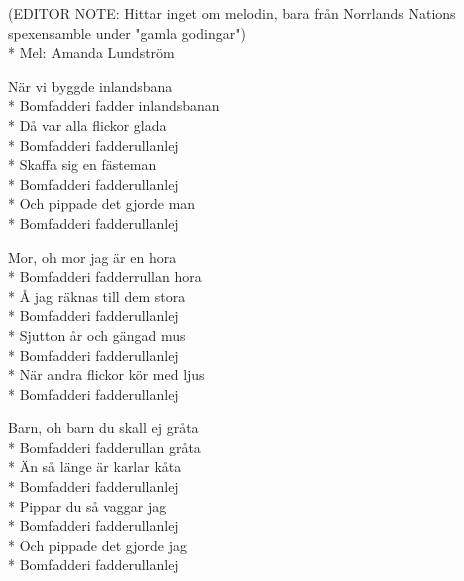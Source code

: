 \begin{SongText}[Inlandsbanan]
    \begin{SongInfo}
        (EDITOR NOTE: Hittar inget om melodin, bara från Norrlands Nations spexensamble under "gamla godingar")\\*%
        Mel: Amanda Lundström
    \end{SongInfo}
    \begin{SongVerse}
        När vi byggde inlandsbana\\*%
        Bomfadderi fadder inlandsbanan\\*%
        Då var alla flickor glada\\*%
        Bomfadderi fadderullanlej\\*%
        Skaffa sig en fästeman\\*%
        Bomfadderi fadderullanlej\\*%
        Och pippade det gjorde man \\*%
        Bomfadderi fadderullanlej
    \end{SongVerse}
    \begin{SongVerse}
        Mor, oh mor jag är en hora\\*%
        Bomfadderi fadderrullan hora\\*%
        Å jag räknas till dem stora\\*%
        Bomfadderi fadderullanlej\\*%
        Sjutton år och gängad mus\\*%
        Bomfadderi fadderullanlej\\*%
        När andra flickor kör med ljus\\*%
        Bomfadderi fadderullanlej
    \end{SongVerse}
    \begin{SongVerse}
        Barn, oh barn du skall ej gråta\\*%
        Bomfadderi fadderullan gråta\\*%
        Än så länge är karlar kåta\\*%
        Bomfadderi fadderullanlej\\*%
        Pippar du så vaggar jag\\*%
        Bomfadderi fadderullanlej\\*%
        Och pippade det gjorde jag\\*%
        Bomfadderi fadderullanlej
    \end{SongVerse}
\end{SongText}